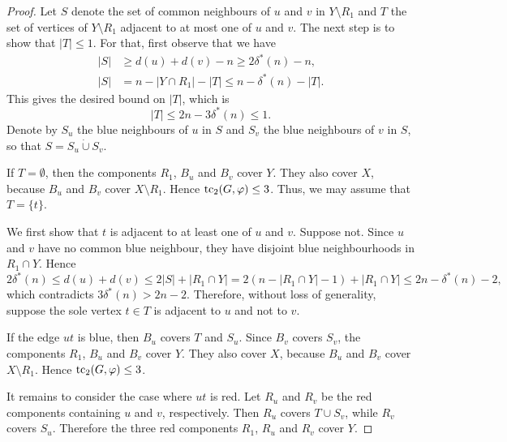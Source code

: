 \documentclass[10pt,a4paper]{amsart}
\def\tc{\mathop{\text{\rm tc}}\nolimits}
\begin{document}
\begin{proof}
Let $S$ denote the set of common neighbours of $u$ and $v$ in $Y \setminus R_1$
and $T$ the set of vertices of $Y \setminus R_1$ adjacent to at most one of $u$
and $v$. The next step is to show that $|T| \le 1$. For that, first observe
that we have
\begin{align*}
|S| &\ge d(u) + d(v) - n \ge 2\delta^*(n) - n,\\
|S| &= n - |Y \cap R_1| - |T| \le n - \delta^*(n) - |T|.
\end{align*}
This gives the desired bound on $|T|$, which is 
\begin{equation*}
|T| \le 2n - 3\delta^*(n) \le 1.
\end{equation*}
Denote by $S_u$ the blue neighbours of $u$ in $S$ and $S_v$ the blue neighbours
of $v$ in $S$, so that $S=S_u\mathbin{\dot\cup}S_v$.

If $T=\emptyset$, then the components $R_1$, $B_u$ and $B_v$ cover $Y$. They
also cover $X$, because $B_u$ and $B_v$ cover $X\setminus R_1$. Hence
$\tc_2(G,\varphi)\le 3$. Thus, we may assume that $T=\{t\}$.

We first show that $t$ is adjacent to at least one of $u$ and $v$. Suppose not.
Since $u$ and $v$ have no common blue neighbour, they have disjoint blue
neighbourhoods in $R_1\cap Y$. Hence
\[
    2\delta^*(n)\le d(u)+d(v)\le 2|S|+|R_1\cap Y|
        =2(n-|R_1\cap Y|-1)+|R_1\cap Y|
        \le 2n-\delta^*(n)-2,
\]
which contradicts $3\delta^*(n)>2n-2$. Therefore, without loss of generality,
suppose the sole vertex $t\in T$ is adjacent to $u$ and not to $v$.

If the edge $ut$ is blue, then $B_u$ covers $T$ and $S_u$. Since $B_v$ covers
$S_v$, the components $R_1$, $B_u$ and $B_v$ cover $Y$. They also cover $X$,
because $B_u$ and $B_v$ cover $X\setminus R_1$. Hence $\tc_2(G,\varphi)\le 3$.

It remains to consider the case where $ut$ is red. Let $R_u$ and $R_v$ be the
red components containing $u$ and $v$, respectively. Then $R_u$ covers
$T\cup S_v$, while $R_v$ covers $S_u$. Therefore the three red components
$R_1$, $R_u$ and $R_v$ cover $Y$.


\end{proof}
\end{document}

